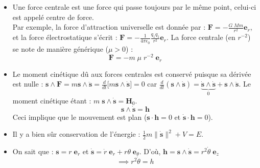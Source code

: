 \documentclass[a4paper]{article}
\begin{document}
\begin{itemize}





\item Une force centrale est une force qui passe toujours par le même point, celui-ci est appelé centre de force. \\
Par exemple, la force d'attraction universelle est donnée par : $\displaystyle \textbf{F} = - \frac{G \; M m}{r^2} \textbf{e}_{r} $, et la force électrostatique s'écrit : $\displaystyle \textbf{F} = - \frac{1}{4 \pi \epsilon_0} \frac{q_1 q_1}{r^2} \textbf{e}_r $. La force centrale (en $ r^{-2} $) se note de manière générique ($ \mu > 0 $) : 
\[ \textbf{F} = - m \; \mu \; r^{-2} \; \textbf{e}_r \]






\item Le moment cinétique dû aux forces centrales est conservé puisque sa dérivée est nulle : $\displaystyle \textbf{s} \wedge \textbf{F} = m \textbf{s} \wedge \ddot{\textbf{s}} = \frac{d}{d t} \big[ m \textbf{s} \wedge \dot{\textbf{s}} \big] = 0 $ car $\displaystyle \frac{d}{d t} (\textbf{s} \wedge \dot{\textbf{s}}) = \underbrace{\dot{\textbf{s}} \wedge \dot{\textbf{s}}}_{0} + \textbf{s} \wedge \ddot{\textbf{s}} $. Le moment cinétique étant : $\displaystyle m \; \textbf{s} \wedge \dot{\textbf{s}} = \textbf{H}_0 $. 
\[ \textbf{s} \wedge \dot{\textbf{s}} = \textbf{h} \]
Ceci implique que le mouvement est plan ($ \textbf{s} \cdot \textbf{h} = 0 $ et $ \dot{\textbf{s}} \cdot \textbf{h} = 0 $).





\item Il y a bien sûr conservation de l'énergie : $\displaystyle \frac{1}{2} m \| \dot{\textbf{s}} \|^2 + V = E $.





\item On sait que : $ \textbf{s} = r \; \textbf{e}_r $ et $ \dot{\textbf{s}} = \dot{r} \; \textbf{e}_r + r \theta \; \textbf{e}_\theta $. D'où, $ \textbf{h} = \textbf{s} \wedge \dot{\textbf{s}} = r^2 \dot{\theta} \; \textbf{e}_z $
\[ \implies r^2 \dot{\theta} = h \]






\end{itemize}
\end{document}
